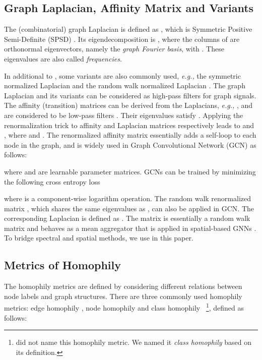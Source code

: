 \documentclass{article}
\newcommand\eg{\textit{e.g.,}}
\newcommand{\0}{{\boldsymbol{0}}}
\newcommand{\6}{{\partial}}
\newcommand{\8}{{\infty}}
\newcommand{\4}{{\nabla}}
\begin{document}
\subsection{Graph Laplacian, Affinity Matrix and Variants} 
\vspace{-0.1cm}
\label{sec:laplacian_affinity_matrix}
The (combinatorial) graph Laplacian is defined as , which is Symmetric Positive Semi-Definite (SPSD)  \cite{chung1997spectral}. Its eigendecomposition is , where the columns  of  are orthonormal eigenvectors, namely the \textit{graph Fourier basis},  with . These eigenvalues are also called \textit{frequencies}. 

In additional to , some variants are also commonly used, \eg{} the symmetric normalized Laplacian  and the random walk normalized Laplacian . The graph Laplacian and its variants can be considered as high-pass filters for graph signals. The affinity (transition) matrices can be derived from the Laplacians, \eg{} ,  and are considered to be low-pass filters \cite{maehara2019revisiting}.
Their eigenvalues satisfy . 
Applying the renormalization trick \cite{kipf2016classification} to affinity and Laplacian matrices respectively leads to  and , 
where  and . The renormalized affinity matrix essentially adds a self-loop to each node in the graph, and is widely used in Graph Convolutional Network (GCN) \cite{kipf2016classification} as follows:

where  and  are learnable parameter matrices. GCNs can be trained by minimizing the following cross entropy loss


where  is a component-wise logarithm operation. The random walk renormalized matrix ,
which shares the same eigenvalues as , can also be applied in GCN. The corresponding Laplacian is defined as . The matrix  is essentially a random walk matrix and
behaves as a mean aggregator that is applied in spatial-based GNNs \cite{hamilton2017inductive,hamilton2020graph}. To bridge spectral and spatial methods, we use  in this paper.


\subsection{Metrics of Homophily}
\vspace{-0.1cm}

\label{sec:homophily_metrics}
The homophily metrics are defined by considering different relations between node labels and graph structures. There are three commonly used homophily metrics: edge homophily \cite{abu2019mixhop,zhu2020beyond}, node homophily \cite{pei2020geom} and class homophily \cite{lim2021new}~\footnote{\cite{lim2021new} did not name this homophily metric. We named it \textit{class homophily} based on its definition.}, defined as follows:
\end{document}
